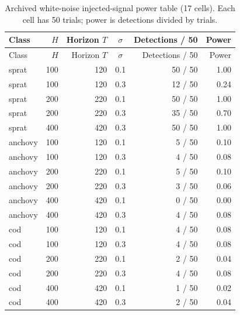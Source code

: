 \begin{longtable}{@{}l r r c r r@{}}
\caption{Archived white-noise injected-signal power table (17 cells). Each cell has 50 trials; power is detections divided by trials.}\label{tab:white-power}\\
\toprule Class & \(H\) & Horizon \(T\) & \(\sigma\) & Detections / 50 & Power \\
\midrule\endfirsthead
\toprule Class & \(H\) & Horizon \(T\) & \(\sigma\) & Detections / 50 & Power \\
\midrule\endhead
\bottomrule\endfoot
sprat & 100 & 120 & 0.1 & 50 / 50 & 1.00 \\
sprat & 100 & 120 & 0.3 & 12 / 50 & 0.24 \\
sprat & 200 & 220 & 0.1 & 50 / 50 & 1.00 \\
sprat & 200 & 220 & 0.3 & 35 / 50 & 0.70 \\
sprat & 400 & 420 & 0.3 & 50 / 50 & 1.00 \\
anchovy & 100 & 120 & 0.1 & 5 / 50 & 0.10 \\
anchovy & 100 & 120 & 0.3 & 4 / 50 & 0.08 \\
anchovy & 200 & 220 & 0.1 & 5 / 50 & 0.10 \\
anchovy & 200 & 220 & 0.3 & 3 / 50 & 0.06 \\
anchovy & 400 & 420 & 0.1 & 0 / 50 & 0.00 \\
anchovy & 400 & 420 & 0.3 & 4 / 50 & 0.08 \\
cod & 100 & 120 & 0.1 & 4 / 50 & 0.08 \\
cod & 100 & 120 & 0.3 & 4 / 50 & 0.08 \\
cod & 200 & 220 & 0.1 & 2 / 50 & 0.04 \\
cod & 200 & 220 & 0.3 & 4 / 50 & 0.08 \\
cod & 400 & 420 & 0.1 & 1 / 50 & 0.02 \\
cod & 400 & 420 & 0.3 & 2 / 50 & 0.04 \\
\end{longtable}

